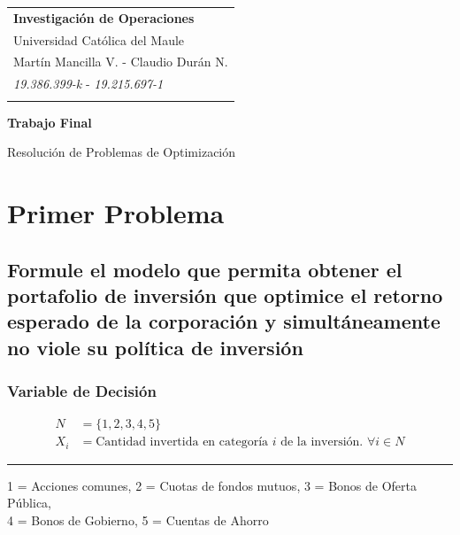 \documentclass[a4paper,12pt]{article}
\begin{document}
	
\thispagestyle{empty}

\begin{tabular}{p{15.5cm}}
	{\large \bf Investigación de Operaciones} \\
	Universidad Católica del Maule \\ Martín Mancilla V. - Claudio Durán N.\\
	\textit{19.386.399-k} - \textit{19.215.697-1} \\
	\hline
	\\
\end{tabular}

\vspace*{0.3cm}

\begin{center}
	{\Large \bf Trabajo Final} 
	\vspace{2mm}
	
	{Resolución de Problemas de Optimización}
	
\end{center}  

\vspace{0.4cm}

\section{Primer Problema}
\subsection{Formule  el  modelo  que  permita  obtener  el  portafolio de  inversión  que  optimice  el  retorno  esperado  de  la	corporación y simultáneamente no viole su política de inversión}
\subsubsection{Variable de Decisión}
\begin{equation*}
	\begin{split}
		N &= \{1,2,3,4,5\} \\
		X_i & = \text{Cantidad invertida en categoría } i \text{ de la inversión. } \forall i \in N
	\end{split}
\end{equation*}
\begin{center}
	\noindent\rule{12cm}{0.4pt}
\end{center}
\begin{shadedbox}
1 = Acciones comunes, 2 = Cuotas de fondos mutuos, 3 = Bonos de Oferta Pública,\\ 4 = Bonos de Gobierno, 5 = Cuentas de Ahorro
\end{shadedbox}
\end{document}
